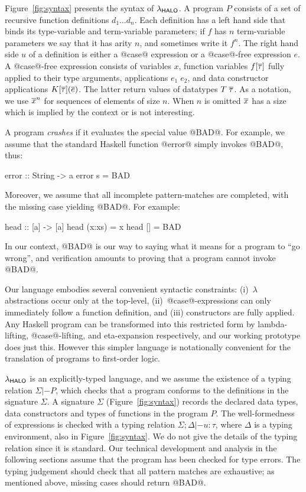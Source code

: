 Figure~\ref{fig:syntax} presents the syntax of $\lambda_{\sf HALO}$.  A program
$P$ consists of a set of recursive function definitions $d_1 \ldots
d_n$. Each definition has a left hand side that binds its type-variable and
term-variable parameters;
if $f$ has $n$ term-variable parameters we say that
it has arity $n$, and sometimes write it $f^n$.
The right hand side $u$ of a definition is either a @case@ expression or a
@case@-free expression $e$.  A @case@-free expression consists of
variables $x$, function variables $f[\overline{\tau}]$ fully applied to their
type arguments, applications $e_1\;e_2$, and data constructor applications
$K[\overline{\tau}](\overline{e})$. The latter return values of datatypes $T\;\overline{\tau}$. As a 
notation, we use $\overline{x}^{n}$ for sequences of elements of size $n$. When $n$ is
omitted $\overline{x}$ has a size which is implied by the context or is not
interesting.

A program \emph{crashes} if it evaluates the special value @BAD@.
For example, we assume that the standard Haskell function @error@
simply invokes @BAD@, thus:
\begin{code}
  error :: String -> a
  error s = BAD
\end{code}
Moreover, we assume that all incomplete pattern-matches are completed, with the
missing case yielding @BAD@.  For example:
\begin{code}
  head :: [a] -> [a]
  head (x:xs) = x
  head []     = BAD
\end{code}
In our context, @BAD@ is our way to saying what it means for a program to ``go wrong'',
and verification amounts to proving that a program cannot invoke @BAD@.

Our language embodies several convenient syntactic constraints:
(i)~$\lambda$ abstractions occur only at the top-level,
(ii)~@case@-expressions can only immediately follow a function
definition, and (iii) constructors are fully applied.
Any Haskell program can be transformed into this restricted
form by lambda-lifting, @case@-lifting, and eta-expansion respectively,
and our working prototype does just this.
However this simpler language is notationally
convenient for the translation of programs to first-order logic.

$\lambda_{\sf HALO}$ is an explicitly-typed language, and we assume the existence
of a typing relation $\Sigma |- P$, which checks that a program
conforms to the definitions in the signature $\Sigma$. A signature
$\Sigma$ (Figure~\ref{fig:syntax}) records the declared data types,
data constructors and types of functions in the program $P$. The
well-formedness of expressions is checked with a typing relation
$\Sigma;\Delta |- u : \tau$, where $\Delta$ is a typing environment,
also in Figure~\ref{fig:syntax}.  We do not give the details of the
typing relation since it is standard.
Our technical development and analysis in the following sections
assume that the program has been checked for type errors.
The typing judgement should check that all pattern matches are
exhaustive; as mentioned above, missing cases should return @BAD@.

